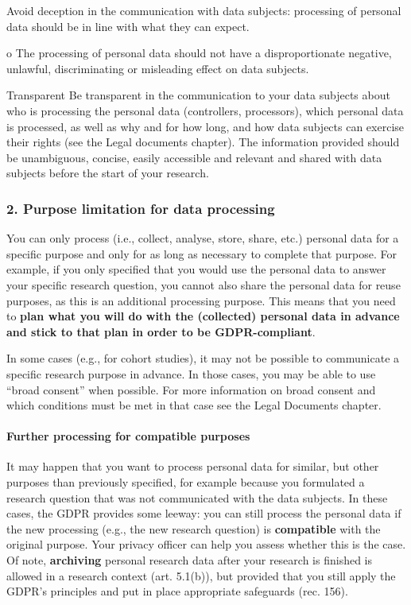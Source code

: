 \documentclass[
]{book}
\begin{document}
Avoid deception in the communication with data subjects: processing of personal data should be in line with what they can expect.

o The processing of personal data should not have a disproportionate negative, unlawful, discriminating or misleading effect on data subjects.

Transparent
Be transparent in the communication to your data subjects about who is processing the personal data (controllers, processors), which personal data is processed, as well as why and for how long, and how data subjects can exercise their rights (see the Legal documents chapter). The information provided should be unambiguous, concise, easily accessible and relevant and shared with data subjects before the start of your research.

\hypertarget{purpose-limitation-for-data-processing}{%
\subsubsection{2. Purpose limitation for data processing}\label{purpose-limitation-for-data-processing}}

You can only process (i.e., collect, analyse, store, share, etc.) personal data for a specific purpose and only for as long as necessary to complete that purpose. For example, if you only specified that you would use the personal data to answer your specific research question, you cannot also share the personal data for reuse purposes, as this is an additional processing purpose. This means that you need to \textbf{plan what you will do with the (collected) personal data in advance and stick to that plan in order to be GDPR-compliant}.

In some cases (e.g., for cohort studies), it may not be possible to communicate a specific research purpose in advance. In those cases, you may be able to use ``broad consent'' when possible. For more information on broad consent and which conditions must be met in that case see the Legal Documents chapter.

\hypertarget{further-processing-for-compatible-purposes}{%
\paragraph{Further processing for compatible purposes}\label{further-processing-for-compatible-purposes}}

It may happen that you want to process personal data for similar, but other purposes than previously specified, for example because you formulated a research question that was not communicated with the data subjects. In these cases, the GDPR provides some leeway: you can still process the personal data if the new processing (e.g., the new research question) is \textbf{compatible} with the original purpose. Your privacy officer can help you assess whether this is the case. Of note, \textbf{archiving} personal research data after your research is finished is allowed in a research context (art. 5.1(b)), but provided that you still apply the GDPR's principles and put in place appropriate safeguards (rec. 156).
\end{document}
